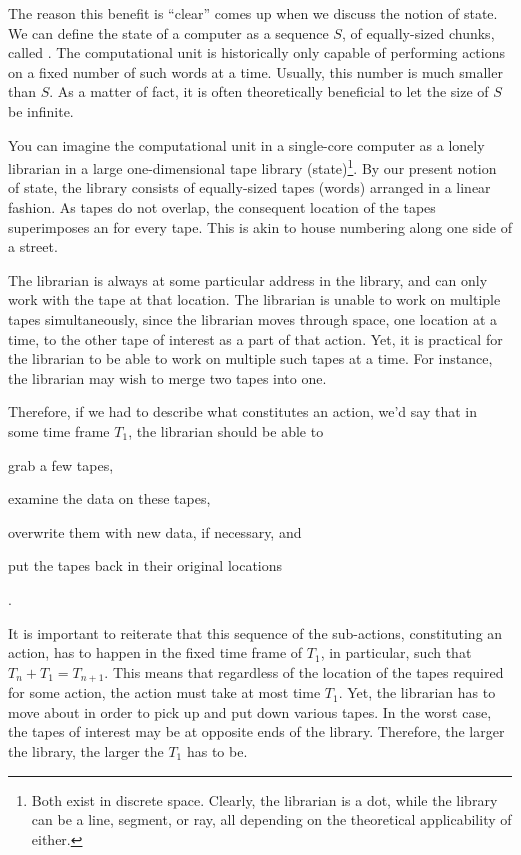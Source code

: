 The reason this benefit is ``clear'' comes up when we discuss the notion of
state. We can define the state of a computer as a sequence $S$, of
equally-sized chunks, called . The computational unit is historically
only capable of performing actions on a fixed number of such words at a time.
Usually, this number is much smaller than $S$. As a matter of fact, it is often
theoretically beneficial to let the size of $S$ be infinite.

You can imagine the computational unit in a single-core computer as a lonely
librarian in a large one-dimensional tape library (state)\footnote{Both exist
in discrete space. Clearly, the librarian is a dot, while the library can be a
line, segment, or ray, all depending on the theoretical applicability of
either.}. By our present notion of state, the library consists of equally-sized
tapes (words) arranged in a linear fashion.  As tapes do not overlap, the
consequent location of the tapes superimposes an  for every tape.
This is akin to house numbering along one side of a street.


The librarian is always at some particular address in the library, and can only
work with the tape at that location. The librarian is unable to work on
multiple tapes simultaneously, since the librarian moves through space, one
location at a time, to the other tape of interest as a part of that action.
Yet, it is practical for the librarian to be able to work on multiple such
tapes at a time. For instance, the librarian may wish to merge two tapes into
one.



Therefore, if we had to describe what constitutes an action, we'd say that in
some time frame $T_1$, the librarian should be able to \begin{inparaenum}[(1)]
\item grab a few tapes, \item examine the data on these tapes, \item overwrite
them with new data, if necessary, and \item put the tapes back in their
original locations\end{inparaenum}.

It is important to reiterate that this sequence of the sub-actions,
constituting an action, has to happen in the fixed time frame of $T_1$, in
particular, such that $T_n+T_1=T_{n+1}$.  This means that regardless of the
location of the tapes required for some action, the action must take at most
time $T_1$. Yet, the librarian has to move about in order to pick up and put
down various tapes. In the worst case, the tapes of interest may be at opposite
ends of the library. Therefore, the larger the library, the larger the $T_1$
has to be. 

